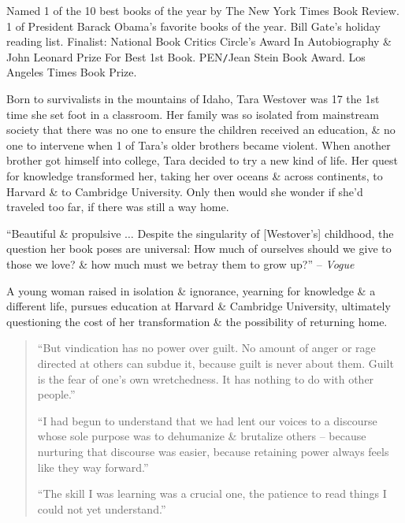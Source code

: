 \documentclass{article}
\begin{document}
\begin{enumerate}
	Named 1 of the 10 best books of the year by The New York Times Book Review. 1 of President {\sc Barack Obama}'s favorite books of the year. {\sc Bill Gate}'s holiday reading list. Finalist: National Book Critics Circle's Award In Autobiography \& John Leonard Prize For Best 1st Book. PEN{\tt/}Jean Stein Book Award. Los Angeles Times Book Prize.
	
	Born to survivalists in the mountains of Idaho, {\sc Tara Westover} was 17 the 1st time she set foot in a classroom. Her family was so isolated from mainstream society that there was no one to ensure the children received an education, \& no one to intervene when 1 of {\sc Tara}'s older brothers became violent. When another brother got himself into college, {\sc Tara} decided to try a new kind of life. Her quest for knowledge transformed her, taking her over oceans \& across continents, to Harvard \& to Cambridge University. Only then would she wonder if she'd traveled too far, if there was still a way home.
	
	``Beautiful \& propulsive $\ldots$ Despite the singularity of [{\sc Westover}'s] childhood, the question her book poses are universal: How much of ourselves should we give to those we love? \& how much must we betray them to grow up?'' -- {\it Vogue}
	
	A young woman raised in isolation \& ignorance, yearning for knowledge \& a different life, pursues education at Harvard \& Cambridge University, ultimately questioning the cost of her transformation \& the possibility of returning home.
	\begin{quote}
		\item ``But vindication has no power over guilt. No amount of anger or rage directed at others can subdue it, because guilt is never about them. Guilt is the fear of one's own wretchedness. It has nothing to do with other people.''
		\item ``I had begun to understand that we had lent our voices to a discourse whose sole purpose was to dehumanize \& brutalize others -- because nurturing that discourse was easier, because retaining power always feels like they way forward.''
		\item ``The skill I was learning was a crucial one, the patience to read things I could not yet understand.''
	\end{quote}
	

\end{enumerate}
\end{document}
